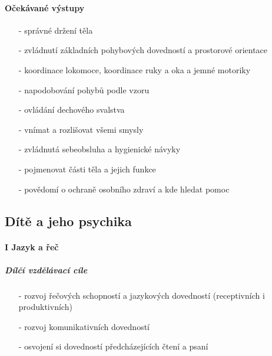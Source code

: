 				\paragraph{Očekávané výstupy}

				\begin{itemize}
				\setlength\itemsep{-2mm}
					\item[-]správné držení těla
					\item[-]zvládnutí základních pohybových dovedností a prostorové orientace
					\item[-]koordinace lokomoce, koordinace ruky a oka a jemné motoriky
					\item[-]napodobování pohybů podle vzoru
					\item[-]ovládání dechového svalstva
					\item[-]vnímat a rozlišovat všemi smysly
					\item[-]zvládnutá sebeobsluha a hygienické návyky
					\item[-]pojmenovat části těla a jejich funkce
					\item[-]povědomí o ochraně osobního zdraví a kde hledat pomoc
				\end{itemize}

			\subsection{Dítě a jeho psychika}
				\textit{} \citep[s.~18]{RVP}
				\paragraph{I Jazyk a řeč}
				 
					\subparagraph{Dílčí vzdělávací cíle}

					\begin{itemize}
					\setlength\itemsep{-2mm}
						\item[-]rozvoj řečových schopností a jazykových dovedností  (receptivních i produktivních)
						\item[-]rozvoj komunikativních dovedností
						\item[-]osvojení si dovedností předcházejících čtení a psaní
					\end{itemize}
					
